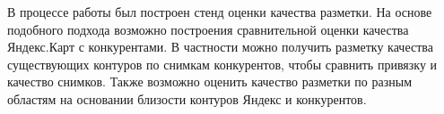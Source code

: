 \documentclass[12pt]{article}
\begin{document}
В процессе работы был построен стенд оценки качества разметки. На основе подобного подхода возможно построения сравнительной оценки качества Яндекс.Карт с конкурентами. В частности можно получить разметку качества существующих контуров по снимкам конкурентов, чтобы сравнить привязку и качество снимков. Также возможно оценить качество разметки по разным областям на основании близости контуров Яндекс и конкурентов.
\end{document}
